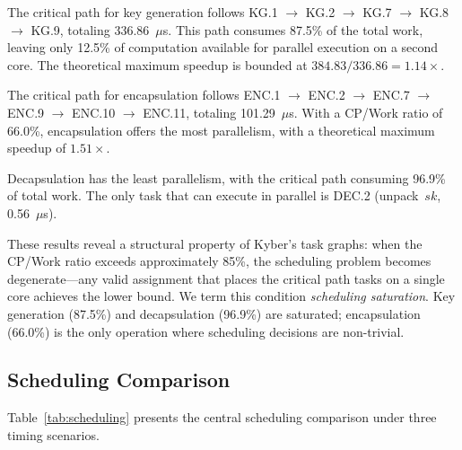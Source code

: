 \documentclass[journal]{IEEEtran}
\begin{document}
The critical path for key generation follows KG.1 $\rightarrow$ KG.2 $\rightarrow$ KG.7 $\rightarrow$ KG.8 $\rightarrow$ KG.9, totaling 336.86~$\mu$s. This path consumes 87.5\% of the total work, leaving only 12.5\% of computation available for parallel execution on a second core. The theoretical maximum speedup is bounded at $384.83 / 336.86 = 1.14\times$.

The critical path for encapsulation follows ENC.1 $\rightarrow$ ENC.2 $\rightarrow$ ENC.7 $\rightarrow$ ENC.9 $\rightarrow$ ENC.10 $\rightarrow$ ENC.11, totaling 101.29~$\mu$s. With a CP/Work ratio of 66.0\%, encapsulation offers the most parallelism, with a theoretical maximum speedup of $1.51\times$.

Decapsulation has the least parallelism, with the critical path consuming 96.9\% of total work. The only task that can execute in parallel is DEC.2 (unpack~$sk$, 0.56~$\mu$s).

These results reveal a structural property of Kyber's task graphs: when the CP/Work ratio exceeds approximately 85\%, the scheduling problem becomes degenerate---any valid assignment that places the critical path tasks on a single core achieves the lower bound. We term this condition \emph{scheduling saturation}. Key generation (87.5\%) and decapsulation (96.9\%) are saturated; encapsulation (66.0\%) is the only operation where scheduling decisions are non-trivial.

\subsection{Scheduling Comparison}

Table~\ref{tab:scheduling} presents the central scheduling comparison under three timing scenarios.
\end{document}
